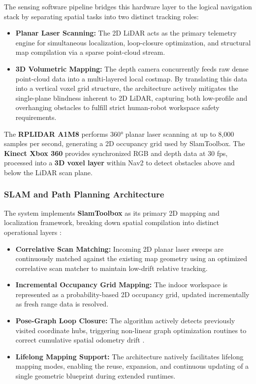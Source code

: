 \documentclass[12pt,a4paper]{report}
\begin{document}
The sensing software pipeline bridges this hardware layer to the logical navigation stack by separating spatial tasks into two distinct tracking roles:
\begin{itemize}[leftmargin=*,itemsep=2pt]
    \item \textbf{Planar Laser Scanning:} The 2D LiDAR acts as the primary telemetry engine for simultaneous localization, loop-closure optimization, and structural map compilation via a sparse point-cloud stream. 
    \item \textbf{3D Volumetric Mapping:} The depth camera concurrently feeds raw dense point-cloud data into a multi-layered local costmap. By translating this data into a vertical voxel grid structure, the architecture actively mitigates the single-plane blindness inherent to 2D LiDAR, capturing both low-profile and overhanging obstacles to fulfill strict human-robot workspace safety requirements.
\end{itemize}

The \textbf{RPLIDAR A1M8} performs 360° planar laser scanning at up to 8,000 samples per second, generating a 2D occupancy grid used by SlamToolbox. The \textbf{Kinect Xbox 360} provides synchronized RGB and depth data at 30 fps, processed into a \textbf{3D voxel layer} within Nav2 to detect obstacles above and below the LiDAR scan plane. 

\subsubsection{SLAM and Path Planning Architecture}
The system implements \textbf{SlamToolbox} as its primary 2D mapping and localization framework, breaking down spatial compilation into distinct operational layers \cite{SlamToolbox}:
\begin{itemize}[leftmargin=*,itemsep=2pt]
    \item \textbf{Correlative Scan Matching:} Incoming 2D planar laser sweeps are continuously matched against the existing map geometry using an optimized correlative scan matcher to maintain low-drift relative tracking.
    \item \textbf{Incremental Occupancy Grid Mapping:} The indoor workspace is represented as a probability-based 2D occupancy grid, updated incrementally as fresh range data is resolved.
    \item \textbf{Pose-Graph Loop Closure:} The algorithm actively detects previously visited coordinate hubs, triggering non-linear graph optimization routines to correct cumulative spatial odometry drift \cite{tu2025design}.
    \item \textbf{Lifelong Mapping Support:} The architecture natively facilitates lifelong mapping modes, enabling the reuse, expansion, and continuous updating of a single geometric blueprint during extended runtimes.
\end{itemize}
\end{document}
